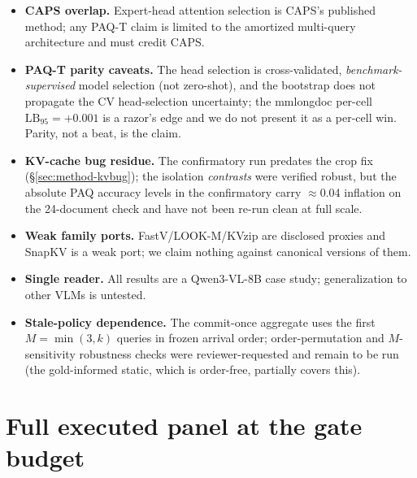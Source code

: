 \documentclass[11pt,letterpaper]{article}
\newcommand{\paq}{\textsc{PAQ}}
\newcommand{\paqt}{\textsc{PAQ-T}}
\newcommand{\lb}{\mathrm{LB}_{95}}
\begin{document}
\begin{itemize}
        used a reduced 4{,}000-token target on 6 large documents, conservative against \paqt{})
        --- the resolution lever is under-tested.
  \item \textbf{CAPS overlap.} Expert-head attention selection is CAPS's published method; any
        \paqt{} claim is limited to the amortized multi-query architecture and must credit CAPS.
  \item \textbf{\paqt{} parity caveats.} The head selection is cross-validated,
        \emph{benchmark-supervised} model selection (not zero-shot), and the bootstrap does not
        propagate the CV head-selection uncertainty; the mmlongdoc per-cell $\lb=+0.001$ is a
        razor's edge and we do not present it as a per-cell win. Parity, not a beat, is the
        claim.
  \item \textbf{KV-cache bug residue.} The confirmatory run predates the crop fix
        (\S\ref{sec:method-kvbug}); the isolation \emph{contrasts} were verified robust, but the
        absolute \paq{} accuracy levels in the confirmatory carry $\approx$0.04 inflation on the
        24-document check and have not been re-run clean at full scale.
  \item \textbf{Weak family ports.} FastV/LOOK-M/KVzip are disclosed proxies and SnapKV is a weak
        port; we claim nothing against canonical versions of them.
  \item \textbf{Single reader.} All results are a Qwen3-VL-8B case study; generalization to other
        VLMs is untested.
  \item \textbf{Stale-policy dependence.} The commit-once aggregate uses the first
        $M{=}\min(3,k)$ queries in frozen arrival order; order-permutation and $M$-sensitivity
        robustness checks were reviewer-requested and remain to be run (the gold-informed static,
        which is order-free, partially covers this).
\end{itemize}

\appendix
\section{Full executed panel at the gate budget}\label{app:panel}
\end{document}
